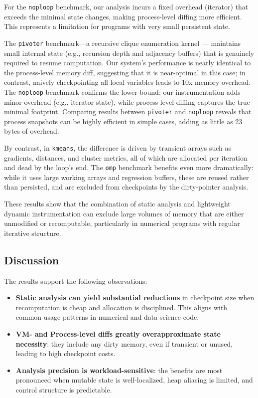 For the \texttt{noploop} benchmark, our analysis incurs a fixed overhead (iterator) that exceeds 
the minimal state changes, making process-level diffing more efficient. This represents a limitation for programs with very small persistent state.

The \texttt{pivoter} benchmark---a recursive clique enumeration kernel --- maintains small internal state (e.g., recursion depth and adjacency buffers) that is genuinely required to resume computation. Our system’s performance is nearly identical to the process-level memory diff, suggesting that it is near-optimal in this case; in contrast, naively checkpointing all local variables leads to 10x memory overhead. The \texttt{noploop} benchmark confirms the lower bound: our instrumentation adds minor overhead (e.g., iterator state), while process-level diffing captures the true minimal footprint. Comparing \texttt{\PROCDIFF} results between \texttt{pivoter} and \texttt{noploop} reveals that process snapshots can be highly efficient in simple cases, adding as little as 23 bytes of overhead.

By contrast, in \texttt{kmeans}, the difference is driven by transient arrays such as gradients, distances, and cluster metrics, all of which are allocated per iteration and dead by the loop's end. The \texttt{omp} benchmark benefits even more dramatically: while it uses large working arrays and regression buffers, these are reused rather than persisted, and are excluded from checkpoints by the dirty-pointer analysis.

These results show that the combination of static analysis and lightweight dynamic instrumentation can exclude large volumes of memory that are either unmodified or recomputable, particularly in numerical programs with regular iterative structure.

\subsection{Discussion}

The results support the following observations:

\begin{itemize}
  \item \textbf{Static analysis can yield substantial reductions} in checkpoint size when recomputation is cheap and allocation is disciplined. This aligns with common usage patterns in numerical and data science code.
  \item \textbf{VM- and Process-level diffs greatly overapproximate state necessity}: they include any dirty memory, even if transient or unused, leading to high checkpoint costs.
  \item \textbf{Analysis precision is workload-sensitive}: the benefits are most pronounced when mutable state is well-localized, heap aliasing is limited, and control structure is predictable.
\end{itemize}

